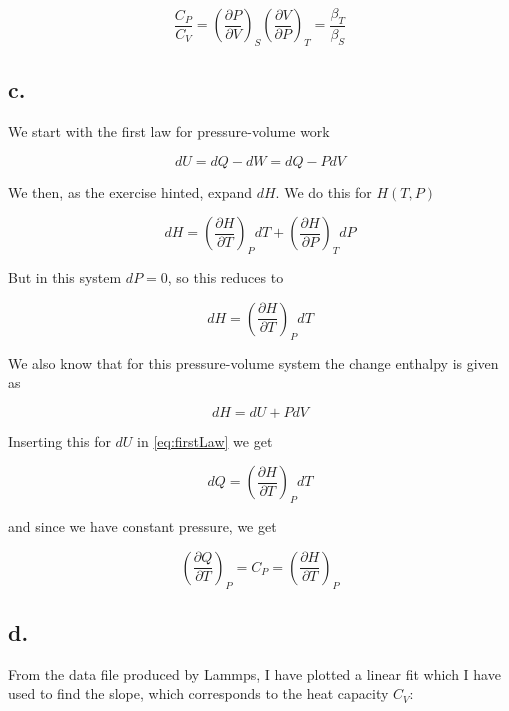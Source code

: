 \documentclass{article}
\newcommand{\pd}[2]{\frac{\partial #1}{\partial #2}}
\begin{document}
\begin{equation}
\frac{C_P}{C_V} = \left(\pd{P}{V}\right)_S \left(\pd{V}{P}\right)_T = \frac{\beta_T}{\beta_S}
\end{equation}

\subsection*{c.}
We start with the first law for pressure-volume work

\begin{equation}
dU = dQ - dW = dQ - PdV
\label{eq:firstLaw}
\end{equation}

We then, as the exercise hinted, expand $dH$. We do this for $H(T,P)$

\begin{equation}
dH = \left(\pd{H}{T}\right)_P dT + \left(\pd{H}{P}\right)_T dP
\end{equation}

But in this system $dP = 0$, so this reduces to

\begin{equation}
dH = \left(\pd{H}{T}\right)_P dT
\end{equation}

We also know that for this pressure-volume system the change enthalpy is given as

\begin{equation}
dH = dU + PdV
\end{equation}

Inserting this for $dU$ in \eqref{eq:firstLaw} we get

\begin{equation}
dQ = \left(\pd{H}{T}\right)_P dT
\end{equation}

and since we have constant pressure, we get

\begin{equation}
\left(\pd{Q}{T}\right)_P = C_P = \left(\pd{H}{T}\right)_P
\end{equation}

\subsection*{d.}

From the data file produced by Lammps, I have plotted a linear fit which I have used to find the slope, which corresponds to the heat capacity $C_V$:
\end{document}
